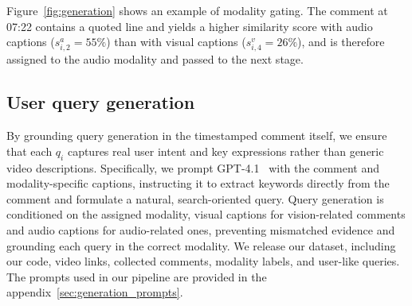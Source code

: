 \documentclass[11pt]{article}
\begin{document}
Figure~\ref{fig:generation} shows an example of modality gating.
The comment at 07:22 contains a quoted line and yields a higher similarity score with audio captions ($s_{i,2}^a = 55\%$) than with visual captions ($s_{i,4}^v = 26\%$), and is therefore assigned to the audio modality and passed to the next stage. 

\vspace{+2.em}
\subsection{User query generation}

By grounding query generation in the timestamped comment itself, we ensure that each $q_i$ captures real user intent and key expressions rather than generic video descriptions. 
Specifically, we prompt GPT-4.1~\citep{openai_gpt41} with the comment and modality-specific captions, instructing it to extract keywords directly from the comment and formulate a natural, search-oriented query. 
Query generation is conditioned on the assigned modality, visual captions for vision-related comments and audio captions for audio-related ones, preventing mismatched evidence and grounding each query in the correct modality. 
We release our dataset, including our code, video links, collected comments, modality labels, and user-like queries. The prompts used in our pipeline are provided in the appendix~\ref{sec:generation_prompts}.


\end{document}

